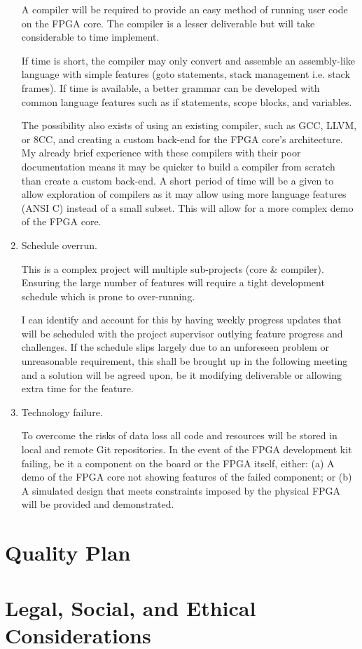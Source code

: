 \documentclass[11pt,a4paper]{article}
\begin{document}
\begin{enumerate}
{A compiler will be required to provide an easy method of running user code on the FPGA core. The compiler is a lesser deliverable but will take considerable to time implement.

If time is short, the compiler may only convert and assemble an assembly-like language with simple features (goto statements, stack management i.e. stack frames). If time is available, a better grammar can be developed with common language features such as if statements, scope blocks, and variables.

The possibility also exists of using an existing compiler, such as GCC, LLVM, or 8CC, and creating a custom back-end for the FPGA core's architecture. My already brief experience with these compilers with their poor documentation means it may be quicker to build a compiler from scratch than create a custom back-end. A short period of time will be a given to allow exploration of compilers as it may allow using more language features (ANSI C) instead of a small subset. This will allow for a more complex demo of the FPGA core.
}

\item{
Schedule overrun. 

This is a complex project will multiple sub-projects (core \& compiler). Ensuring the large number of features will require a tight development schedule which is prone to over-running.

I can identify and account for this by having weekly progress updates that will be scheduled with the project supervisor outlying feature progress and challenges. If the schedule slips largely due to an unforeseen problem or unreasonable requirement, this shall be brought up in the following meeting and a solution will be agreed upon, be it modifying deliverable or allowing extra time for the feature.
}

\item{Technology failure. 

To overcome the risks of data loss all code and resources will be stored in local and remote Git repositories.
In the event of the FPGA development kit failing, be it a component on the board or the FPGA itself, either: (a) A demo of the FPGA core not showing features of the failed component; or (b) A simulated design that meets constraints imposed by the physical FPGA will be provided and demonstrated.
}
\end{enumerate}


\section{Quality Plan}

\section{Legal, Social, and Ethical Considerations}

\citep{null}
\newpage

 
\end{document}

